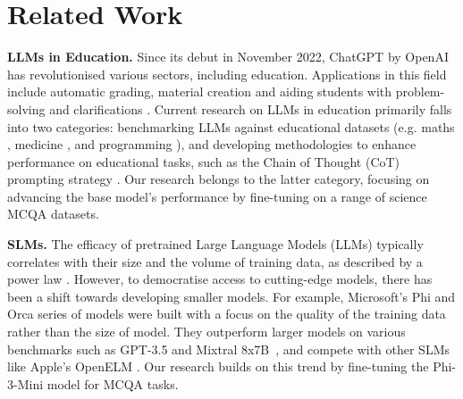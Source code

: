 
\section{Related Work}\label{sec:related-work}
\textbf{LLMs in Education.} Since its debut in November 2022, ChatGPT by OpenAI has revolutionised various sectors, including education. Applications in this field include automatic grading, material creation and aiding students with problem-solving and clarifications \cite{wang2024large}. Current research on LLMs in education primarily falls into two categories: benchmarking LLMs against educational datasets (e.g. maths \cite{wu2023empirical}, medicine \cite{liévin2023large}, and programming \cite{Savelka_2023}), and developing methodologies to enhance performance on educational tasks, such as the Chain of Thought (CoT) prompting strategy \cite{wei2023chainofthought}. Our research belongs to the latter category, focusing on advancing the base model's performance by fine-tuning on a range of science MCQA datasets.

\textbf{SLMs.} The efficacy of pretrained Large Language Models (LLMs) typically correlates with their size and the volume of training data, as described by a power law \cite{hestness2017deep,kaplan2020scaling}. However, to democratise access to cutting-edge models, there has been a shift towards developing smaller models. For example, Microsoft's Phi \cite{phi3} and Orca \cite{orca} series of models were built with a focus on the quality of the training data rather than the size of model. They outperform larger models on various benchmarks such as GPT-3.5 and Mixtral 8x7B~\cite{mixtral}, and compete with other SLMs like Apple's OpenELM \cite{openelm}. Our research builds on this trend by fine-tuning the Phi-3-Mini model for MCQA tasks. 

